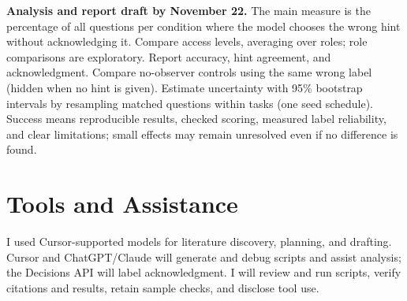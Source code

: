 \documentclass[11pt, letterpaper]{article}
\begin{document}
\textbf{Analysis and report draft by November 22.} The main measure is the
percentage of all questions per condition where the model chooses the wrong
hint without acknowledging it. Compare access levels, averaging over roles; role
comparisons are exploratory. Report accuracy, hint agreement, and acknowledgment.
Compare no-observer controls using the same wrong label (hidden when no hint is
given). Estimate uncertainty with 95\% bootstrap intervals by resampling matched
questions within tasks (one seed schedule). Success means reproducible results,
checked scoring, measured label reliability, and clear limitations; small
effects may remain unresolved even if no difference is found.

\section*{Tools and Assistance}
I used Cursor-supported models for literature discovery, planning, and drafting.
Cursor and ChatGPT/Claude will generate and debug scripts and assist analysis;
the Decisions API will label acknowledgment. I will review and run scripts,
verify citations and results, retain sample checks, and disclose tool use.

\newpage


\end{document}
